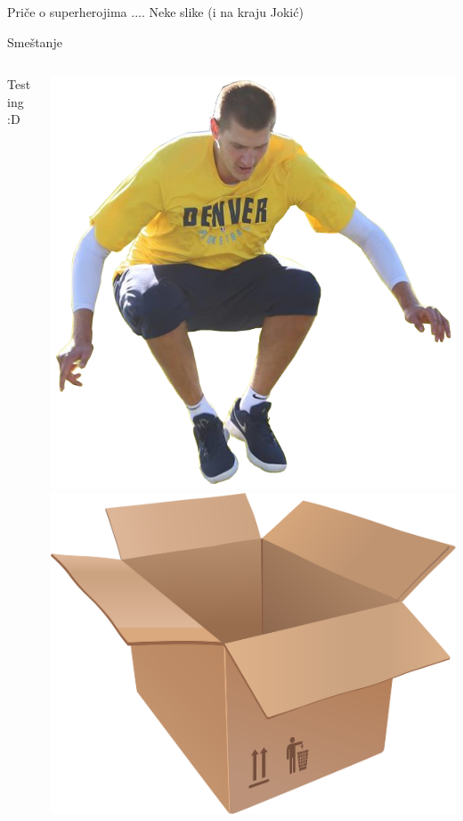 \documentclass{beamer}
\begin{document}
    \begin{frame}{Priče o superherojima}
        .... Neke slike (i na kraju Jokić)
    \end{frame}
    \begin{frame}{Smeštanje}
        \begin{columns}
        \begin{column}{0.5\textwidth}
            Testing :D
        \end{column}
        \begin{column}{0.5\textwidth}
            \includegraphics[height=0.4\textheight]{Res/Jokic/Jokic_skok} \\
            \includegraphics[height=0.3\textheight]{Res/box}

\end{column}
\end{columns}
\end{frame}
\end{document}

